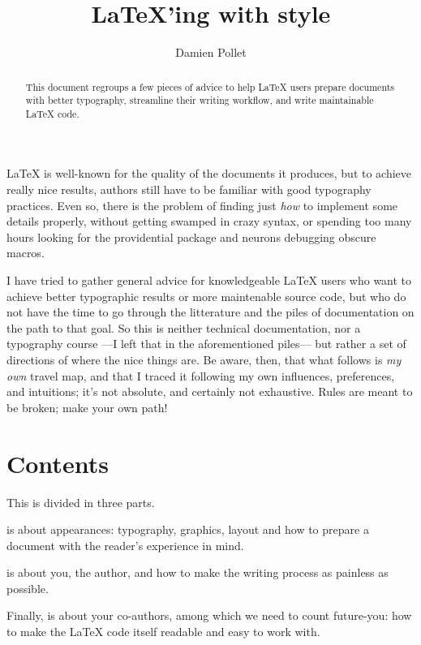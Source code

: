 \documentclass[a4paper,twoside,nofonts]{tufte-handout}
\title{\LaTeX'ing with style}
\author{Damien Pollet}
\date{}
\begin{document}
\maketitle

\begin{abstract}
  This document regroups a few pieces of advice to help \LaTeX{} users prepare documents with better typography, streamline their writing workflow, and write maintainable \LaTeX{} code.
\end{abstract}
\vfill


\noindent
\LaTeX{} is well-known for the quality of the documents it produces, but to achieve really nice results, authors still have to be familiar with good typography practices.
Even so, there is the problem of finding just \emph{how} to implement some details properly, without getting swamped in crazy syntax, or spending too many hours looking for the providential package and neurons debugging obscure macros.

I have tried to gather general advice for knowledgeable \LaTeX{} users who want to achieve better typographic results or more maintenable source code, but who do not have the time to go through the litterature and the piles of documentation on the path to that goal.
So this is neither technical documentation, nor a typography course ---I left that in the aforementioned piles--- but rather a set of directions of where the nice things are.
Be aware, then, that what follows is \emph{my own} travel map, and that I traced it following my own influences, preferences, and intuitions; it's not absolute, and certainly not exhaustive.
Rules are meant to be broken; make your own path!

\section*{Contents}

This is divided in three parts.

\emph{} is about appearances: typography, graphics, layout and how to prepare a document with the reader's experience in mind.

\emph{} is about you, the author, and how to make the writing process as painless as possible.

Finally, \emph{} is about your co-authors, among which we need to count future-you: how to make the \LaTeX{} code itself readable and easy to work with.
\end{document}
